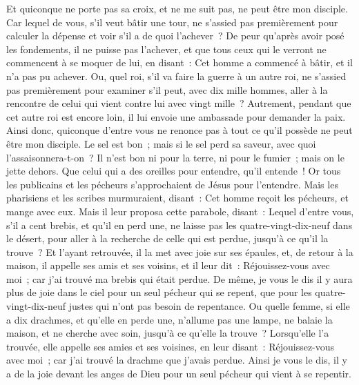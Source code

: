 \begin{multicols}{2}
Et quiconque ne porte pas sa croix, et ne me suit pas, ne peut être mon disciple.
Car lequel de vous, s'il veut bâtir une tour, ne s'assied pas premièrement pour calculer la dépense et voir s'il a de quoi l'achever~?
De peur qu'après avoir posé les fondements, il ne puisse pas l'achever, et que tous ceux qui le verront ne commencent à se moquer de lui,
en disant~: Cet homme a commencé à bâtir, et il n'a pas pu achever.
Ou, quel roi, s'il va faire la guerre à un autre roi, ne s'assied pas premièrement pour examiner s'il peut, avec dix mille hommes, aller à la rencontre de celui qui vient contre lui avec vingt mille~?
Autrement, pendant que cet autre roi est encore loin, il lui envoie une ambassade pour demander la paix.
Ainsi donc, quiconque d'entre vous ne renonce pas à tout ce qu'il possède ne peut être mon disciple.
Le sel est bon~; mais si le sel perd sa saveur, avec quoi l'assaisonnera-t-on~?
Il n'est bon ni pour la terre, ni pour le fumier~; mais on le jette dehors. Que celui qui a des oreilles pour entendre, qu'il entende~!
\VerseOne{}Or tous les publicains et les pécheurs s'approchaient de Jésus pour l'entendre.
Mais les pharisiens et les scribes murmuraient, disant~: Cet homme reçoit les pécheurs, et mange avec eux.
Mais il leur proposa cette parabole, disant~:
Lequel d'entre vous, s'il a cent brebis, et qu'il en perd une, ne laisse pas les quatre-vingt-dix-neuf dans le désert, pour aller à la recherche de celle qui est perdue, jusqu'à ce qu'il la trouve~?
Et l'ayant retrouvée, il la met avec joie sur ses épaules,
et, de retour à la maison, il appelle ses amis et ses voisins, et il leur dit~: Réjouissez-vous avec moi~; car j'ai trouvé ma brebis qui était perdue.
De même, je vous le dis il y aura plus de joie dans le ciel pour un seul pécheur qui se repent, que pour les quatre-vingt-dix-neuf justes qui n'ont pas besoin de repentance.
Ou quelle femme, si elle a dix drachmes, et qu'elle en perde une, n'allume pas une lampe, ne balaie la maison, et ne cherche avec soin, jusqu'à ce qu'elle la trouve~?
Lorsqu'elle l'a trouvée, elle appelle ses amies et ses voisines, en leur disant~: Réjouissez-vous avec moi~; car j'ai trouvé la drachme que j'avais perdue.
Ainsi je vous le dis, il y a de la joie devant les anges de Dieu pour un seul pécheur qui vient à se repentir.

\end{multicols}
